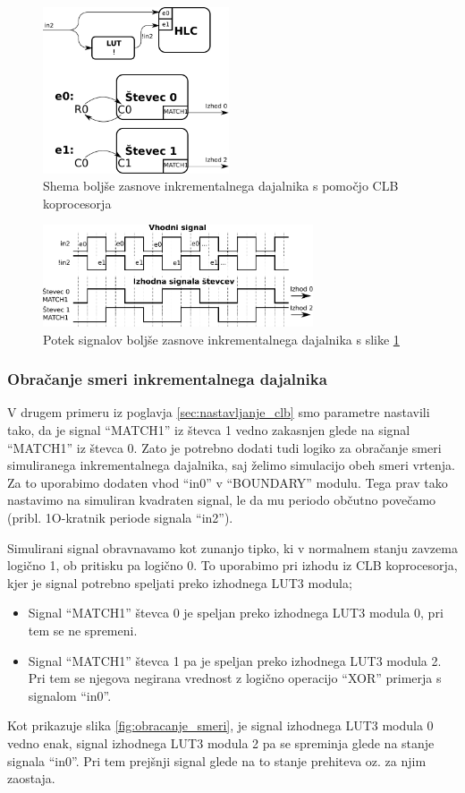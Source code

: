\documentclass[a4paper]{article}
\begin{document}
\begin{figure}[htb]
    \centerline{\includegraphics[width=5.5cm]{dobra_zasnova_shema}}
    \caption{Shema boljše zasnove inkrementalnega dajalnika s pomočjo CLB koprocesorja}
    \label{fig:dobra_zasnova_shema}
\end{figure}

\begin{figure}[htb]
    \centerline{\includegraphics[width=8cm]{dobra_zasnova_potek}}
    \caption{Potek signalov boljše zasnove inkrementalnega dajalnika s slike \ref{fig:dobra_zasnova_shema}}
    \label{fig:dobra_zasnova_potek}
\end{figure}

\subsubsection{Obračanje smeri inkrementalnega dajalnika}
V drugem primeru iz poglavja \ref{sec:nastavljanje_clb} smo parametre nastavili tako, da je signal ``MATCH1'' iz števca 1 vedno zakasnjen glede na signal ``MATCH1'' iz števca 0. Zato je potrebno dodati tudi logiko za obračanje smeri simuliranega inkrementalnega dajalnika, saj želimo simulacijo obeh smeri vrtenja. Za to uporabimo dodaten vhod ``in0'' v ``BOUNDARY'' modulu. Tega prav tako nastavimo na simuliran kvadraten signal, le da mu periodo občutno povečamo (pribl. 1O-kratnik periode signala ``in2'').

Simulirani signal obravnavamo kot zunanjo tipko, ki v normalnem stanju zavzema logično 1, ob pritisku pa logično 0. To uporabimo pri izhodu iz CLB koprocesorja, kjer je signal potrebno speljati preko izhodnega LUT3 modula;
\begin{itemize}
    \item Signal ``MATCH1'' števca 0 je speljan preko izhodnega LUT3 modula 0, pri tem se ne spremeni.
    \item Signal ``MATCH1'' števca 1 pa je speljan preko izhodnega LUT3 modula 2. Pri tem se njegova negirana vrednost z logično operacijo ``XOR'' primerja s signalom ``in0''.
\end{itemize}
Kot prikazuje slika \ref{fig:obracanje_smeri}, je signal izhodnega LUT3 modula 0 vedno enak, signal izhodnega LUT3 modula 2 pa se spreminja glede na stanje signala ``in0''. Pri tem prejšnji signal glede na to stanje prehiteva oz. za njim zaostaja.
\end{document}
